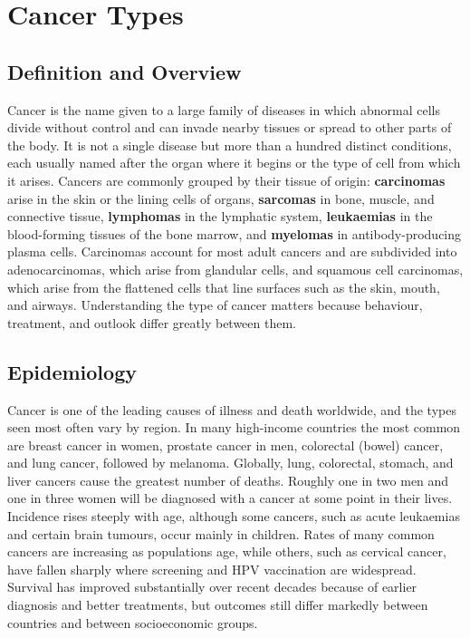 \chapter{Cancer Types}

\section*{Definition and Overview}
Cancer is the name given to a large family of diseases in which abnormal cells divide without control and can invade nearby tissues or spread to other parts of the body. It is not a single disease but more than a hundred distinct conditions, each usually named after the organ where it begins or the type of cell from which it arises. Cancers are commonly grouped by their tissue of origin: \textbf{carcinomas} arise in the skin or the lining cells of organs, \textbf{sarcomas} in bone, muscle, and connective tissue, \textbf{lymphomas} in the lymphatic system, \textbf{leukaemias} in the blood-forming tissues of the bone marrow, and \textbf{myelomas} in antibody-producing plasma cells. Carcinomas account for most adult cancers and are subdivided into adenocarcinomas, which arise from glandular cells, and squamous cell carcinomas, which arise from the flattened cells that line surfaces such as the skin, mouth, and airways. Understanding the type of cancer matters because behaviour, treatment, and outlook differ greatly between them.

\section*{Epidemiology}
Cancer is one of the leading causes of illness and death worldwide, and the types seen most often vary by region. In many high-income countries the most common are breast cancer in women, prostate cancer in men, colorectal (bowel) cancer, and lung cancer, followed by melanoma. Globally, lung, colorectal, stomach, and liver cancers cause the greatest number of deaths. Roughly one in two men and one in three women will be diagnosed with a cancer at some point in their lives. Incidence rises steeply with age, although some cancers, such as acute leukaemias and certain brain tumours, occur mainly in children. Rates of many common cancers are increasing as populations age, while others, such as cervical cancer, have fallen sharply where screening and HPV vaccination are widespread. Survival has improved substantially over recent decades because of earlier diagnosis and better treatments, but outcomes still differ markedly between countries and between socioeconomic groups.

